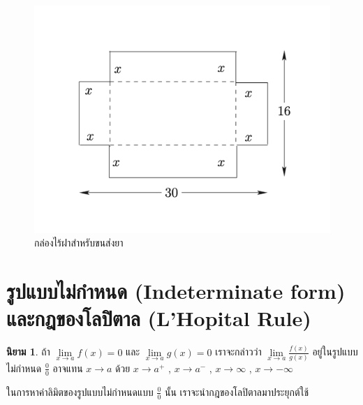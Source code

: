 \documentclass[
]{book}
\theoremstyle{definition}
\newtheorem{definition}{นิยาม}[chapter]
\theoremstyle{definition}
\theoremstyle{definition}
\theoremstyle{definition}
\theoremstyle{remark}
\begin{document}
\begin{figure}

{\centering \includegraphics[width=0.5\linewidth]{images/graph10} 

}

\caption{กล่องไร้ฝาสำหรับขนส่งยา}\label{fig:graph10}
\end{figure}

\section{รูปแบบไม่กำหนด (Indeterminate form) และกฎของโลปิตาล (L'Hopital Rule)}\label{uxe23uxe1buxe41uxe1auxe1auxe44uxe21uxe01uxe33uxe2buxe19uxe14-indeterminate-form-uxe41uxe25uxe30uxe01uxe0euxe02uxe2duxe07uxe42uxe25uxe1buxe15uxe32uxe25-lhopital-rule}

\begin{definition}
ถ้า \(\mathop {\lim }\limits_{x\to a} f(x)=0\) และ \(\displaystyle \mathop
{\lim
}\limits_{x\to a} g(x)=0\) เราจะกล่าวว่า \(\displaystyle \mathop {\lim
}\limits_{x\to a}
\frac{f(x)}{g(x)}\) อยู่ในรูปแบบไม่กำหนด \(\displaystyle \frac{0}{0}\) อาจแทน
\(x\to a\) ด้วย \(x\to a^+\) , \(x\to a^-\) , \(x\to \infty\) , \(x\to -\infty\)
\end{definition}

ในการหาค่าลิมิตของรูปแบบไม่กำหนดแบบ \(\displaystyle \frac{0}{0}\) นั้น
เราจะนำกฎของโลปิตาลมาประยุกต์ใช้
\end{document}
